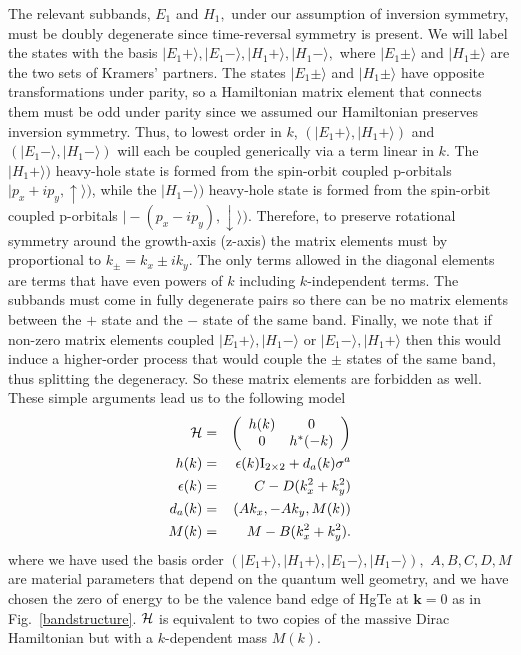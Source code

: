 \documentclass{article}
\begin{document}
The relevant subbands, $E_1$ and $H_1,$ under our assumption of
inversion symmetry,  must be doubly degenerate since time-reversal
symmetry is present. We will label the states with the basis
$\vert E_1 +\rangle,\vert E_1 -\rangle,\vert H_1 +\rangle,\vert
H_1 -\rangle,$ where $\vert E_1 \pm\rangle$ and $\vert H_1
\pm\rangle$ are the two sets of Kramers' partners. The states
$\vert E_1 \pm\rangle$ and $\vert H_1 \pm\rangle$  have opposite
transformations under parity, so a Hamiltonian matrix element that
connects them must be odd under parity since we assumed our
Hamiltonian preserves inversion symmetry. Thus, to lowest order in
$k$, $(\vert E_1 +\rangle,\vert H_1 +\rangle)$ and $(\vert E_1
-\rangle,\vert H_1 -\rangle)$ will each be coupled generically via
a term linear in $k.$ The $\vert H_1 +\rangle)$ heavy-hole state
is formed from the spin-orbit coupled p-orbitals $\vert p_x+ip_y,
\uparrow\rangle)$, while the $\vert H_1 -\rangle)$ heavy-hole
state is formed from the spin-orbit coupled p-orbitals $\vert
-(p_x-ip_y), \downarrow\rangle)$. Therefore, to preserve
rotational symmetry around the growth-axis (z-axis) the matrix
elements must by proportional to $k_{\pm}=k_x\pm ik_y.$ The only
terms allowed in the diagonal elements are terms that have even
powers of $k$ including $k$-independent terms. The subbands must
come in fully degenerate pairs so there can be no matrix elements
between the $+$ state and the $-$ state of the same band. Finally,
we note that if non-zero matrix elements coupled $\vert E_1
+\rangle,\vert H_1 -\rangle$ or $\vert E_1 -\rangle,\vert H_1
+\rangle$ then this would induce a higher-order process that would
couple the $\pm$ states of the same band, thus splitting the
degeneracy. So these matrix elements are forbidden as well. These
simple arguments lead us to the following model
\begin{eqnarray}
{\cal{H}}&=&\left(\begin{array}{cc} h(k)& 0\\
0&h^{*}(-k)\end{array}\right)\label{contH}\\
h(k)&=&\epsilon (k) {\rm{I}}_{2\times 2}+d_a(k)\sigma^a\\
\epsilon (k)&=&C-D(k_{x}^2+k_{y}^2) \\
d_a (k)&=&\left(A k_x,-Ak_y,M(k)\right)\\
M(k)&=& M-B(k_{x}^2+k_{y}^2). \end{eqnarray}\noindent
 where we have used the basis order $({\vert
E_1 +\rangle,\vert H_1 +\rangle,\vert E_1 -\rangle,\vert H_1
-\rangle}),$
 $A,B,C,D,M$ are material parameters that depend on the quantum
well geometry, and we have chosen the zero of energy to be the
valence band edge of HgTe at ${\textbf{k}}=0$ as in
Fig.~\ref{bandstructure}. ${\cal{H}}$ is equivalent to two copies of
the massive Dirac Hamiltonian but with a $k$-dependent mass $M(k)$.
\end{document}
